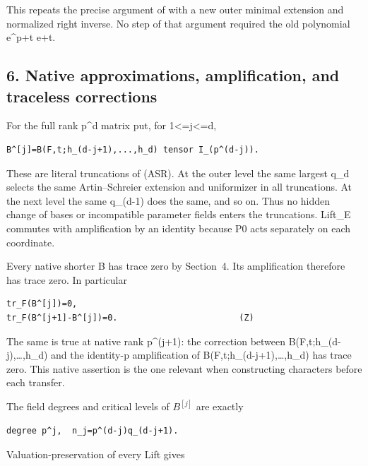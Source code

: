 This repeats the precise argument of  with a new
outer minimal extension and normalized right inverse. No step of that
argument required the old polynomial e\^{}p+t e+t.

\hypertarget{odd_tower-native-approximations-amplification-and-traceless-corrections}{%
\subsection{6. Native approximations, amplification, and traceless
corrections}\label{odd_tower-native-approximations-amplification-and-traceless-corrections}}

For the full rank p\^{}d matrix put, for 1\textless=j\textless=d,

\begin{Verbatim}[fontsize=\small,breaklines=true,breakanywhere=true]
B^[j]=B(F,t;h_(d-j+1),...,h_d) tensor I_(p^(d-j)).
\end{Verbatim}

These are literal truncations of (ASR). At the outer level the same
largest q\_d selects the same Artin--Schreier extension and uniformizer
in all truncations. At the next level the same q\_(d-1) does the same,
and so on. Thus no hidden change of bases or incompatible parameter
fields enters the truncations. Lift\_E commutes with amplification by an
identity because P0 acts separately on each coordinate.

Every native shorter B has trace zero by Section~4. Its amplification
therefore has trace zero. In particular

\begin{Verbatim}[fontsize=\small,breaklines=true,breakanywhere=true]
tr_F(B^[j])=0,
tr_F(B^[j+1]-B^[j])=0.                        (Z)
\end{Verbatim}

The same is true at native rank p\^{}(j+1): the correction between
B(F,t;h\_(d-j),\ldots,h\_d) and the identity-p amplification of
B(F,t;h\_(d-j+1),\ldots,h\_d) has trace zero. This native assertion is
the one relevant when constructing characters before each transfer.

The field degrees and critical levels of \(B^{[j]}\) are exactly

\begin{Verbatim}[fontsize=\small,breaklines=true,breakanywhere=true]
degree p^j,  n_j=p^(d-j)q_(d-j+1).
\end{Verbatim}

Valuation-preservation of every Lift gives

